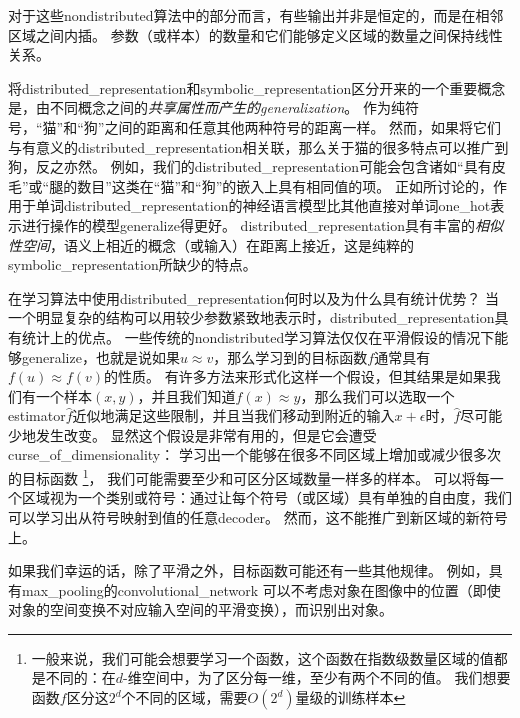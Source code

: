 

对于这些\gls{nondistributed}算法中的部分而言，有些输出并非是恒定的，而是在相邻区域之间内插。
参数（或样本）的数量和它们能够定义区域的数量之间保持线性关系。


将\gls{distributed_representation}和\gls{symbolic_representation}区分开来的一个重要概念是，由不同概念之间的\emph{共享属性而产生的\gls{generalization}}。
作为纯符号，``猫''和``狗''之间的距离和任意其他两种符号的距离一样。
然而，如果将它们与有意义的\gls{distributed_representation}相关联，那么关于猫的很多特点可以推广到狗，反之亦然。
例如，我们的\gls{distributed_representation}可能会包含诸如``具有皮毛''或``腿的数目''这类在``猫''和``狗''的嵌入上具有相同值的项。
正如所讨论的，作用于单词\gls{distributed_representation}的神经语言模型比其他直接对单词\gls{one_hot}表示进行操作的模型\gls{generalize}得更好。
\gls{distributed_representation}具有丰富的\emph{相似性空间}，语义上相近的概念（或输入）在距离上接近，这是纯粹的\gls{symbolic_representation}所缺少的特点。


在学习算法中使用\gls{distributed_representation}何时以及为什么具有统计优势？
当一个明显复杂的结构可以用较少参数紧致地表示时，\gls{distributed_representation}具有统计上的优点。
一些传统的\gls{nondistributed}学习算法仅仅在平滑假设的情况下能够\gls{generalize}，也就是说如果$u\approx v$，那么学习到的目标函数$f$通常具有$f(u) \approx f(v)$的性质。
有许多方法来形式化这样一个假设，但其结果是如果我们有一个样本$(x,y)$，并且我们知道$f(x) \approx y$，那么我们可以选取一个\gls{estimator}$\hat{f}$近似地满足这些限制，并且当我们移动到附近的输入$x + \epsilon$时，$\hat{f}$尽可能少地发生改变。
显然这个假设是非常有用的，但是它会遭受\gls{curse_of_dimensionality}：
学习出一个能够在很多不同区域上增加或减少很多次的目标函数
\footnote{一般来说，我们可能会想要学习一个函数，这个函数在指数级数量区域的值都是不同的：在$d$-维空间中，为了区分每一维，至少有两个不同的值。
我们想要函数$f$区分这$2^d$个不同的区域，需要$O(2^d)$量级的训练样本}，
我们可能需要至少和可区分区域数量一样多的样本。
可以将每一个区域视为一个类别或符号：通过让每个符号（或区域）具有单独的自由度，我们可以学习出从符号映射到值的任意\gls{decoder}。
然而，这不能推广到新区域的新符号上。


如果我们幸运的话，除了平滑之外，目标函数可能还有一些其他规律。
例如，具有\gls{max_pooling}的\gls{convolutional_network}
可以不考虑对象在图像中的位置（即使对象的空间变换不对应输入空间的平滑变换），而识别出对象。

